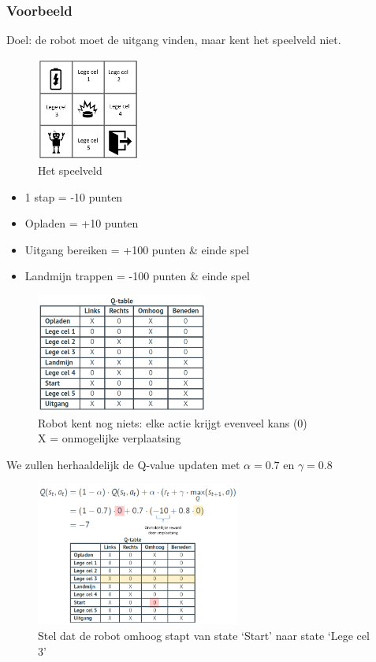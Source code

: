 \documentclass{article}
\begin{document}
\subsubsection{Voorbeeld}

Doel: de robot moet de uitgang vinden, maar kent het speelveld niet.

\begin{figure}[H]
    \centering
    \includegraphics[width=0.3\textwidth]{q-table1.png}
    \caption{Het speelveld}
\end{figure}

\begin{itemize}
    \item 1 stap = -10 punten
    \item Opladen = +10 punten
    \item Uitgang bereiken = +100 punten \& einde spel
    \item Landmijn trappen = -100 punten \& einde spel
\end{itemize}

\begin{figure}[H]
    \centering
    \includegraphics[width=0.5\textwidth]{q-table2.png}
    \caption{Robot kent nog niets: elke actie krijgt evenveel kans (0)\\ X = onmogelijke verplaatsing}
\end{figure}

We zullen herhaaldelijk de Q-value updaten met $\alpha = 0.7$ en $\gamma = 0.8$


\begin{figure}[H]
    \centering
    \includegraphics[width=0.6\textwidth]{q-table3.png}
    \caption{Stel dat de robot omhoog stapt van state `Start' naar state `Lege cel 3'}
\end{figure}
\end{document}
